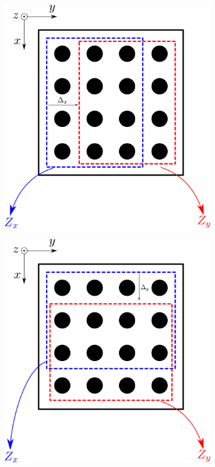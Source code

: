 \begin{figure}[ht!]
    \centering
    \begin{subfigure}[b]{0.49\textwidth}
        \centering
        \includegraphics[width=\linewidth]{images/03-DOAEst/esprit_x.png}
    \end{subfigure}
    \hfill
    \begin{subfigure}[b]{0.49\textwidth}
        \centering
        \includegraphics[width=\linewidth]{images/03-DOAEst/esprit_y.png}

\end{subfigure}
\end{figure}
